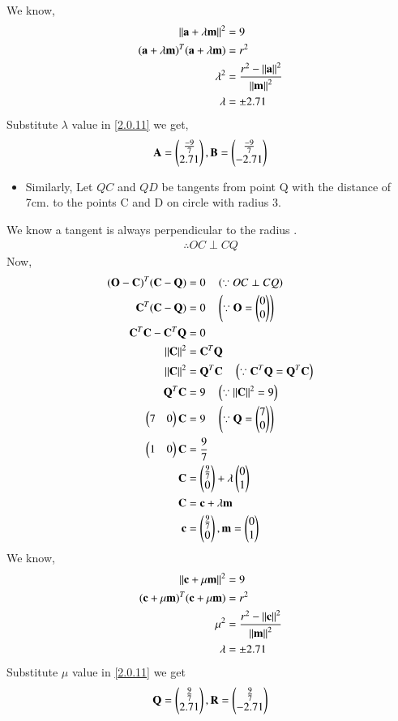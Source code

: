 \documentclass[journal,12pt,twocolumn]{IEEEtran}
\begin{document}
 We know,
\begin{align}
\left\lVert\mathbf{a}+\lambda\mathbf{m}\right\rVert^2&=9
\\
(\mathbf{a}+\lambda \mathbf{m})^T(\mathbf{a}+\lambda \mathbf{m})&=r^2
\\
\lambda^2&=\frac{r^2-\left\lVert\mathbf{a}\right\rVert^2}{\left\lVert\mathbf{m}\right\rVert^2}
\\
\lambda &= \pm2.71
\end{align}
Substitute $\lambda$  value in \eqref{2.0.11} we get,
\begin{align}
\mathbf{A}=\begin{pmatrix}\frac{-9}{7}\\2.71\end{pmatrix},
\mathbf{B}=\begin{pmatrix}\frac{-9}{7}\\-2.71\end{pmatrix}
\end{align}
\begin{itemize}
\item Similarly, Let $QC$ and $QD$  be tangents from point Q with the distance of 7cm. to the points C and D on circle with radius 3.
\end{itemize}
 We know a tangent is always perpendicular to the radius .
\begin{align}
\therefore OC \perp CQ
\end{align}
Now,
\begin{align}
(\mathbf{O}-\mathbf{C})^T (\mathbf{C}-\mathbf{Q}) &= 0 \quad \left(\because OC \perp CQ \right)
\\
\mathbf{C}^T(\mathbf{C}-\mathbf{Q}) &= 0 \quad \left(\because \mathbf{O}=\begin{pmatrix}0\\0\end{pmatrix}\right)
\\
\mathbf{C}^T \mathbf{C} - \mathbf{C}^T \mathbf{Q} &= 0  
\\
\left\lVert\mathbf{C}\right\rVert^2 &= \mathbf{C}^T \mathbf{Q}
\\
\left\lVert\mathbf{C}\right\rVert^2 &= \mathbf{Q}^T \mathbf{C}  \quad \left(\because \mathbf{C}^T \mathbf{Q} = \mathbf{Q}^T \mathbf{C}\right)
\\
\mathbf{Q}^T \mathbf{C} &= 9 \quad \left(\because \left\lVert\mathbf{C}\right\rVert^2 = 9\right)
\\
\begin{pmatrix}7&0\end{pmatrix} \mathbf{C} &= 9 \quad \left(\because \mathbf{Q} = \begin{pmatrix}7\\0\end{pmatrix} \right)
\\
\begin{pmatrix}1&0\end{pmatrix} \mathbf{C} &= \frac{9}{7}
\\
\mathbf{C} &= \begin{pmatrix}\frac{9}{7}\\0\end{pmatrix} + \lambda \begin{pmatrix}0\\1\end{pmatrix} \label{2.0.11} 
\\
\mathbf{C}&=\mathbf{c}+\lambda\mathbf{m} 
\\
\mathbf{c}&=\begin{pmatrix}\frac{9}{7}\\ 0\end{pmatrix},\mathbf{m}=\begin{pmatrix}0\\1\end{pmatrix}
\end{align}
We know,
\begin{align}
\left\lVert\mathbf{c}+\mu\mathbf{m}\right\rVert^2&=9
\\
(\mathbf{c}+\mu \mathbf{m})^T(\mathbf{c}+\mu \mathbf{m})&=r^2
\\
\mu^2&=\frac{r^2-\left\lVert\mathbf{c}\right\rVert^2}{\left\lVert\mathbf{m}\right\rVert^2}
\\
\lambda &= \pm2.71
\end{align}
Substitute $\mu$  value in \eqref{2.0.11} we get
\begin{align}
\mathbf{Q}=\begin{pmatrix}\frac{9}{7}\\2.71\end{pmatrix},
\mathbf{R}=\begin{pmatrix}\frac{9}{7}\\-2.71\end{pmatrix}
\end{align}
\end{document}
